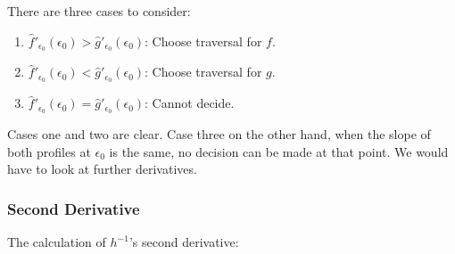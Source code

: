 There are three cases to consider:

\begin{enumerate}
	\item $\hat{f}'_{\epsilon_0}(\epsilon_0) > \hat{g}'_{\epsilon_0}(\epsilon_0)$: Choose traversal for $f$.
	\item $\hat{f}'_{\epsilon_0}(\epsilon_0) < \hat{g}'_{\epsilon_0}(\epsilon_0)$: Choose traversal for $g$.
	\item $\hat{f}'_{\epsilon_0}(\epsilon_0) = \hat{g}'_{\epsilon_0}(\epsilon_0)$: Cannot decide.
\end{enumerate}

Cases one and two are clear. Case three on the other hand, when the slope of both profiles at $\epsilon_0$ is the same, no decision can be made at that point. We would have to look at further derivatives.


\subsubsection{Second Derivative}

The calculation of $h^{-1}$'s second derivative:

